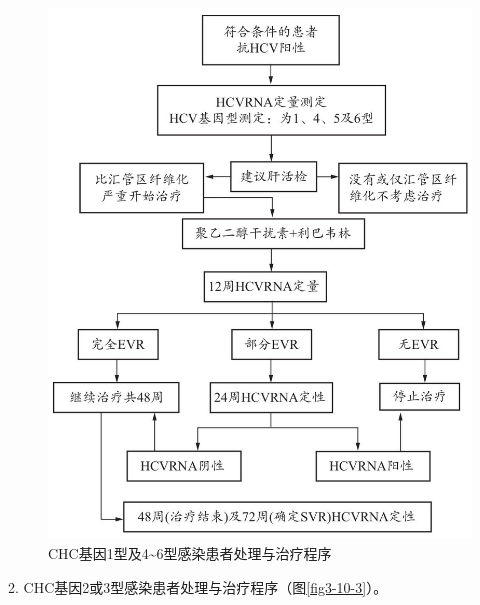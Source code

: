 \begin{figure}[!htbp]
 \centering
 \includegraphics{./images/Image00098.jpg}
 \captionsetup{justification=centering}
 \caption{CHC基因1型及4\textasciitilde{}6型感染患者处理与治疗程序}
 \label{fig3-10-2}
  \end{figure} 

2. CHC基因2或3型感染患者处理与治疗程序（图\ref{fig3-10-3}）。

